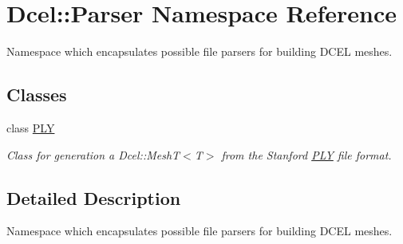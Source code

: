 \hypertarget{namespaceDcel_1_1Parser}{}\section{Dcel\+:\+:Parser Namespace Reference}
\label{namespaceDcel_1_1Parser}


Namespace which encapsulates possible file parsers for building D\+C\+EL meshes.  


\subsection*{Classes}
\begin{DoxyCompactItemize}
\item 
class \hyperlink{classDcel_1_1Parser_1_1PLY}{P\+LY}
\begin{DoxyCompactList}\small\item\em Class for generation a Dcel\+::\+Mesh\+T$<$\+T$>$ from the Stanford \hyperlink{classDcel_1_1Parser_1_1PLY}{P\+LY} file format. \end{DoxyCompactList}\end{DoxyCompactItemize}


\subsection{Detailed Description}
Namespace which encapsulates possible file parsers for building D\+C\+EL meshes. 